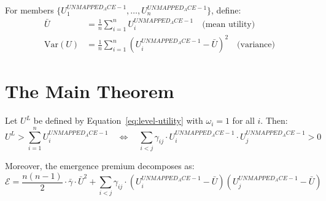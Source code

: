 \begin{definition}
\label{def:utility-stats}
For members $\{U^{UNMAPPED_ACE-1}_1, \ldots, U^{UNMAPPED_ACE-1}_n\}$, define:
\begin{align}
\bar{U} &= \frac{1}{n} \sum_{i=1}^{n} U^{UNMAPPED_ACE-1}_i \quad \text{(mean utility)} \\
\text{Var}(U) &= \frac{1}{n} \sum_{i=1}^{n} (U^{UNMAPPED_ACE-1}_i - \bar{U})^2 \quad \text{(variance)}
\end{align}
\end{definition}


\section{The Main Theorem}
\label{sec:let-theorem}

\begin{theorem}
\label{thm:let}
Let $U^L$ be defined by Equation~\ref{eq:level-utility} with $\omega_i = 1$ for all $i$.
Then:
\begin{equation}
U^L > \sum_{i=1}^{n} U^{UNMAPPED_ACE-1}_i \quad \Longleftrightarrow \quad \sum_{i<j} \gamma_{ij} \cdot U^{UNMAPPED_ACE-1}_i \cdot U^{UNMAPPED_ACE-1}_j > 0
\label{eq:let-condition}
\end{equation}

Moreover, the emergence premium decomposes as:
\begin{equation}
\boxed{\mathcal{E} = \frac{n(n-1)}{2} \cdot \bar{\gamma} \cdot \bar{U}^2 + \sum_{i<j} \gamma_{ij} \cdot (U^{UNMAPPED_ACE-1}_i - \bar{U})(U^{UNMAPPED_ACE-1}_j - \bar{U})}
\label{eq:emergence-decomposition}
\end{equation}
\end{theorem}

